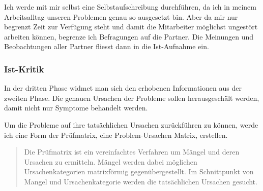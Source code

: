 Ich werde mit mir selbst eine Selbstaufschreibung durchführen, da ich in meinem 
Arbeitsalltag unseren Problemen genau so ausgesetzt bin. Aber da mir nur begrenzt
Zeit zur Verfügung steht und damit die Mitarbeiter möglichst ungestört arbeiten
können, begrenze ich Befragungen auf die Partner. Die Meinungen und Beobachtungen
aller Partner fliesst dann in die Ist-Aufnahme ein.

\subsubsection{Ist-Kritik}
In der dritten Phase widmet man sich den erhobenen Informationen aus der zweiten Phase. 
Die genauen Ursachen der Probleme sollen herausgeschält werden, damit nicht nur 
Symptome behandelt werden. 

Um die Probleme auf ihre tatsächlichen Ursachen zurückführen zu können,
werde ich eine Form der Prüfmatrix, eine Problem-Ursachen Matrix, erstellen.

\begin{quote}
    Die Prüfmatrix ist ein vereinfachtes Verfahren um Mängel und deren Ursachen 
    zu ermitteln. Mängel werden dabei möglichen Ursachenkategorien matrixförmig 
    gegenübergestellt. Im Schnittpunkt von Mangel und Ursachenkategorie werden 
    die tatsächlichen Ursachen gesucht.\cite{schmidt2000methode}
\end{quote}